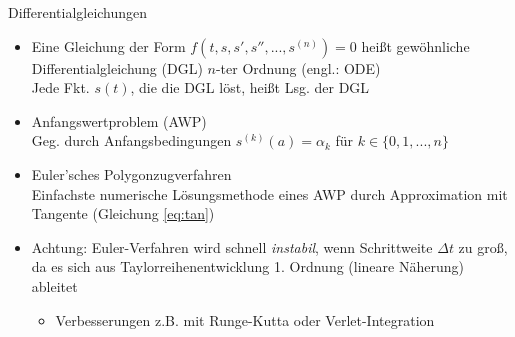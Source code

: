 \documentclass{beamer}
\begin{document}
\begin{frame}{Differentialgleichungen}
    
    \begin {itemize}
    
    \item  Eine Gleichung der Form $f(t, s, s', s'', ..., s^{(n)}) = 0$ heißt gewöhnliche 
    Differentialgleichung (DGL) $n$-ter Ordnung (engl.: ODE) \\
    Jede Fkt. $s (t)$, die die DGL löst, heißt Lsg. der DGL
    
        \item Anfangswertproblem (AWP)\\
        Geg. durch Anfangsbedingungen $s^{(k)} (a) = \alpha_k$ für $k \in \{0, 1, ..., n\}$
        
        \item Euler'sches Polygonzugverfahren\\
        Einfachste numerische Lösungsmethode eines AWP durch Approximation mit Tangente 
        (Gleichung \ref{eq:tan})
        
        \item Achtung: Euler-Verfahren wird schnell \emph{instabil}, wenn Schrittweite $\Delta t$ zu groß, 
        da es sich aus Taylorreihenentwicklung 1. Ordnung (lineare Näherung) ableitet
        
        \begin{itemize}
        \item Verbesserungen z.B. mit Runge-Kutta oder Verlet-Integration
        \end{itemize}
   
   \end{itemize}
\end{frame}
\end{document}
